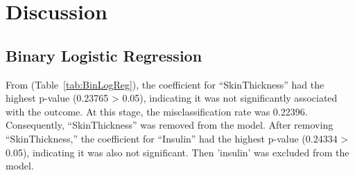 \documentclass[12pt]{article}
\begin{document}
\section{Discussion}
\subsection{Binary Logistic Regression}

\begin{table}[h!]
	\centering
	\caption{Binary Logistic Regression Output}
	\label{tab:BinLogReg}
\end{table}



From (Table~\ref{tab:BinLogReg}), the coefficient for “SkinThickness” had the highest p-value (0.23765 > 0.05), indicating it was not significantly associated with the outcome. At this stage, the misclassification rate was 0.22396. Consequently, “SkinThickness” was removed from the model. After removing “SkinThickness,” the coefficient for “Insulin” had the highest p-value (0.24334 > 0.05), indicating it was also not significant. Then 'insulin' was excluded from the model.\\
\end{document}
